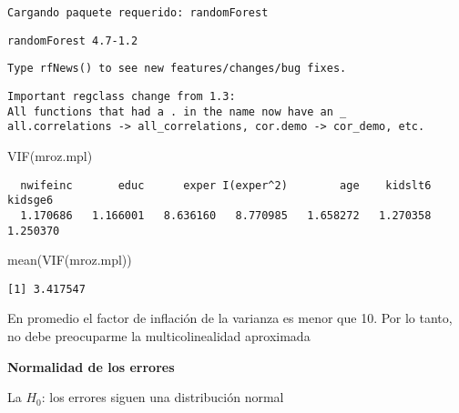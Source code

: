 \documentclass[
  letterpaper,
  DIV=11,
  numbers=noendperiod]{scrreprt}
\newenvironment{Shaded}{\begin{snugshade}}{\end{snugshade}}
\newcommand{\FunctionTok}[1]{\textcolor[rgb]{0.28,0.35,0.67}{#1}}
\newcommand{\NormalTok}[1]{\textcolor[rgb]{0.00,0.23,0.31}{#1}}
\newcommand{\SpecialCharTok}[1]{\textcolor[rgb]{0.37,0.37,0.37}{#1}}
\begin{document}
\begin{verbatim}
Cargando paquete requerido: randomForest
\end{verbatim}

\begin{verbatim}
randomForest 4.7-1.2
\end{verbatim}

\begin{verbatim}
Type rfNews() to see new features/changes/bug fixes.
\end{verbatim}

\begin{verbatim}
Important regclass change from 1.3:
All functions that had a . in the name now have an _
all.correlations -> all_correlations, cor.demo -> cor_demo, etc.
\end{verbatim}

\begin{Shaded}
\begin{Highlighting}[]
\FunctionTok{VIF}\NormalTok{(mroz.mpl)}
\end{Highlighting}
\end{Shaded}

\begin{verbatim}
  nwifeinc       educ      exper I(exper^2)        age    kidslt6    kidsge6 
  1.170686   1.166001   8.636160   8.770985   1.658272   1.270358   1.250370 
\end{verbatim}

\begin{Shaded}
\begin{Highlighting}[]
\FunctionTok{mean}\NormalTok{(}\FunctionTok{VIF}\NormalTok{(mroz.mpl))}
\end{Highlighting}
\end{Shaded}

\begin{verbatim}
[1] 3.417547
\end{verbatim}

En promedio el factor de inflación de la varianza es menor que 10. Por
lo tanto, no debe preocuparme la multicolinealidad aproximada

\textbf{Normalidad de los errores}

La \(H_0\): los errores siguen una distribución normal

\begin{Shaded}
\end{Shaded}
\end{document}
